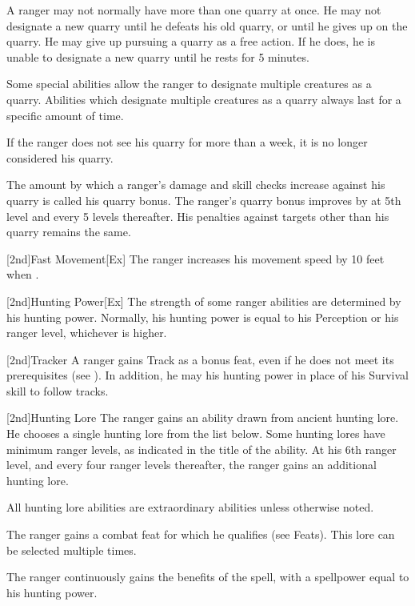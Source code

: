         A ranger may not normally have more than one quarry at once.
        He may not designate a new quarry until he defeats his old quarry, or until he gives up on the quarry.
        He may give up pursuing a quarry as a free action.
        If he does, he is unable to designate a new quarry until he rests for 5 minutes.

        Some special abilities allow the ranger to designate multiple creatures as a quarry.
        Abilities which designate multiple creatures as a quarry always last for a specific amount of time.

        If the ranger does not see his quarry for more than a week, it is no longer considered his quarry.

        \par The amount by which a ranger's damage and skill checks increase against his quarry is called his quarry bonus.
        The ranger's quarry bonus improves by  at 5th level and every 5 levels thereafter.
        His penalties against targets other than his quarry remains the same.

        [2nd]{Fast Movement}[Ex]
        The ranger increases his movement speed by 10 feet when \unencumbered.

        [2nd]{Hunting Power}[Ex]
        The strength of some ranger abilities are determined by his hunting power.
        Normally, his hunting power is equal to his Perception or his ranger level, whichever is higher.

        [2nd]{Tracker}
        A ranger gains Track as a bonus feat, even if he does not meet its prerequisites (see ).
        In addition, he may his hunting power in place of his Survival skill to follow tracks.

        [2nd]{Hunting Lore}
        The ranger gains an ability drawn from ancient hunting lore.
        He chooses a single hunting lore from the list below.
        Some hunting lores have minimum ranger levels, as indicated in the title of the ability.
        At his 6th ranger level, and every four ranger levels thereafter, the ranger gains an additional hunting lore.

        All hunting lore abilities are extraordinary abilities unless otherwise noted.

        The ranger gains a combat feat for which he qualifies (see Feats).
        This lore can be selected multiple times.

        The ranger continuously gains the benefits of the  spell, with a spellpower equal to his hunting power.


